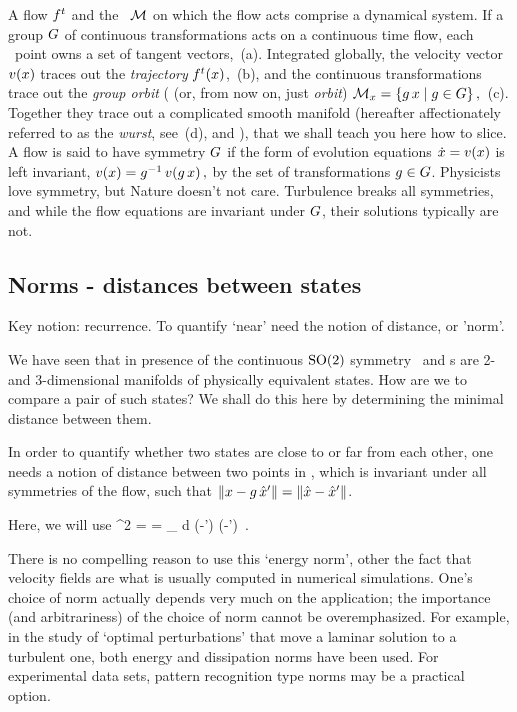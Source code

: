 A flow $f^t$ and the \statesp\ ${\cal M}$ on which the flow acts comprise a
{dynamical system}.
If a group $G$ of continuous transformations acts on a continuous
time flow, each \statesp\ point owns a set of tangent vectors,
\,(a). Integrated globally, the velocity vector
$v(x)$ traces out the {\em trajectory} ${f^{t}(x)}$,
\,(b), and the continuous transformations trace out
the \emph{group orbit} ( (or,
from now on, just \emph{orbit})
\(
{\cal M}_{x} = \{g\,x \mid g \in {\ensuremath{G}}\}
\,,
\) %
\,(c). Together they trace out a complicated smooth
manifold (hereafter affectionately referred to as the {\em wurst}, see
\,(d),  and ), that we shall
teach you here how to slice.
A flow is said to have symmetry $G$ if the form of evolution
equations $\dot{x} = v(x)$ is left invariant,
\(
v(x)=g^{-1} \, v(g \, x)
\,,
\) %
by the set of transformations $g \in {\ensuremath{G}}$. Physicists love
symmetry, but Nature doesn't not care. Turbulence breaks all symmetries,
and while the flow equations are invariant under $G$, their
solutions typically are not.


\subsection{Norms - distances between states}

Key notion: recurrence.
To quantify `near' need the notion of distance, or 'norm'.


We have seen that in presence of the continuous $\textrm{SO}(2)$ symmetry
\reqva\ and \rpo s are 2- and 3-dimensional manifolds of physically
equivalent states. How are we to compare a pair of such states? We shall
do this here by determining the minimal distance between them.

In order to quantify
whether two states are close to or far from each other, one
needs a notion of distance between two points in \statesp, which
is invariant under all symmetries of the flow, such that
$\|{x-g\,{\hat{x}'}}\|=\|{\hat{x}-{\hat{x}'}}\|$.

Here, we will use
\beq
  ^2  =  =
\int_\bCell \! d \bx \;
(-') \cdot (-')
\,.

There is no compelling reason to use this {`energy norm'}, other the fact that
velocity fields are what is usually computed in numerical simulations. One's choice
of norm actually depends very much on the application; the importance (and arbitrariness)
of the choice of norm cannot be overemphasized. For example, in the study of
`optimal perturbations' that move a laminar solution to a turbulent one, both energy
\citep{TeHaHe10} and dissipation \citep{LoCaCoPeGo11} norms have been
used. For experimental data sets, pattern recognition type norms may be a practical option.


